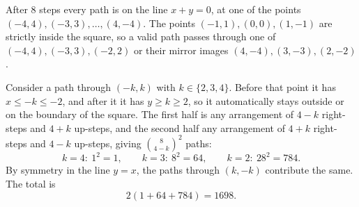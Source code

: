 After $8$ steps every path is on the line $x+y=0$, at one of the points $(-4,4),(-3,3),\ldots,(4,-4)$. The points $(-1,1),(0,0),(1,-1)$ are strictly inside the square, so a valid path passes through one of $(-4,4),(-3,3),(-2,2)$ or their mirror images $(4,-4),(3,-3),(2,-2)$.

Consider a path through $(-k,k)$ with $k\in\{2,3,4\}$. Before that point it has $x\le-k\le-2$, and after it it has $y\ge k\ge2$, so it automatically stays outside or on the boundary of the square. The first half is any arrangement of $4-k$ right-steps and $4+k$ up-steps, and the second half any arrangement of $4+k$ right-steps and $4-k$ up-steps, giving $\binom{8}{4-k}^2$ paths:
\[
k=4:\ 1^2=1,\qquad k=3:\ 8^2=64,\qquad k=2:\ 28^2=784 .
\]
By symmetry in the line $y=x$, the paths through $(k,-k)$ contribute the same. The total is
\[
2(1+64+784)=\boxed{1698}.
\]
